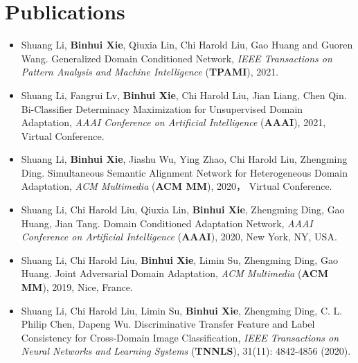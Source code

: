 \documentclass[letterpaper,11pt]{article}
\begin{document}
\section{Publications}
\begin{itemize}
    \item Shuang Li, {\bf Binhui Xie}, Qiuxia Lin, Chi Harold Liu, Gao Huang and Guoren Wang. Generalized Domain Conditioned Network, \textit{IEEE Transactions on Pattern Analysis and Machine Intelligence} ({\bf TPAMI}), 2021.
    \item Shuang Li, Fangrui Lv, \textbf{Binhui Xie}, Chi Harold Liu, Jian Liang, Chen Qin. Bi-Classifier Determinacy Maximization for Unsupervised Domain Adaptation, \textit{AAAI Conference on Artificial Intelligence} ({\bf AAAI}), 2021, Virtual Conference.
    \item Shuang Li, \textbf{Binhui Xie}, Jiashu Wu, Ying Zhao, Chi Harold Liu, Zhengming Ding. Simultaneous Semantic Alignment Network for Heterogeneous Domain Adaptation, \textit{ACM Multimedia} ({\bf ACM MM}), 2020， Virtual Conference.
    \item Shuang Li, Chi Harold Liu, Qiuxia Lin, \textbf{Binhui Xie}, Zhengming Ding, Gao Huang, Jian Tang. Domain Conditioned Adaptation Network, \textit{AAAI Conference on Artificial Intelligence} ({\bf AAAI}), 2020, New York, NY, USA.
    \item Shuang Li, Chi Harold Liu, \textbf{Binhui Xie}, Limin Su, Zhengming Ding, Gao Huang. Joint Adversarial Domain Adaptation, \textit{ACM Multimedia} ({\bf ACM MM}), 2019, Nice, France.
    \item Shuang Li, Chi Harold Liu, Limin Su, \textbf{Binhui Xie}, Zhengming Ding, C. L. Philip Chen, Dapeng Wu. Discriminative Transfer Feature and Label Consistency for Cross-Domain Image Classification, \textit{IEEE Transactions on Neural Networks and Learning Systems} ({\bf TNNLS}), 31(11): 4842-4856 (2020).
\end{itemize}

\end{document}
